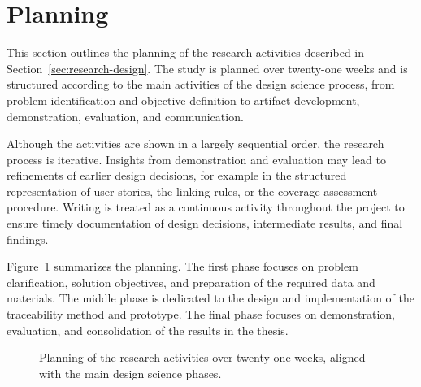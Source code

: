 \section{Planning}
\label{sec:planning}

This section outlines the planning of the research activities described in Section~\ref{sec:research-design}. The study is planned over twenty-one weeks and is structured according to the main activities of the design science process, from problem identification and objective definition to artifact development, demonstration, evaluation, and communication.

Although the activities are shown in a largely sequential order, the research process is iterative. Insights from demonstration and evaluation may lead to refinements of earlier design decisions, for example in the structured representation of user stories, the linking rules, or the coverage assessment procedure. Writing is treated as a continuous activity throughout the project to ensure timely documentation of design decisions, intermediate results, and final findings.

Figure~\ref{fig:planning-gantt} summarizes the planning. The first phase focuses on problem clarification, solution objectives, and preparation of the required data and materials. The middle phase is dedicated to the design and implementation of the traceability method and prototype. The final phase focuses on demonstration, evaluation, and consolidation of the results in the thesis.

\begin{figure}[h!tb]
    \centering
    \caption{Planning of the research activities over twenty-one weeks, aligned with the main design science phases.}
    \label{fig:planning-gantt}
\end{figure}

